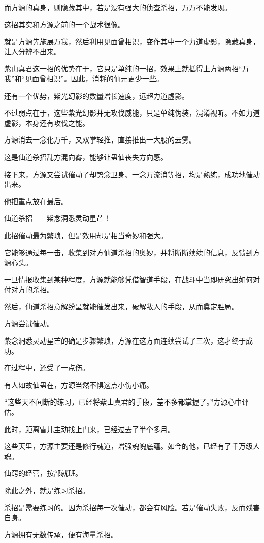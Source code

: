 \begin{this_body}
而方源的真身，则隐藏其中，若是没有强大的侦查杀招，万万不能发现。

这招其实和方源之前的一个战术很像。

就是方源先施展万我，然后利用见面曾相识，变作其中一个力道虚影，隐藏真身，让人分辨不出来。

紫山真君这一招的优势在于，它只是单纯的一招，效果上就抵得上方源两招“万我”和“见面曾相识”。因此，消耗的仙元更少一些。

还有一个优势，紫光幻影的数量增长速度，远超力道虚影。

不过弱点在于，这些紫光幻影并无攻伐威能，只是单纯伪装，混淆视听。不如力道虚影，本身还有攻伐之能。

方源消去一念化万千，又双掌轻推，直接推出一大股的云雾。

这是仙道杀招乱方混向雾，能够让蛊仙丧失方向感。

接下来，方源又尝试催动了却势念卫身、一念万流消等招，均是熟练，成功地催动出来。

他把重点放在最后。

仙道杀招——紫念洞悉灵动星芒！

此招催动最为繁琐，但是效用却是相当奇妙和强大。

它能够通过每一击，收集到对方仙道杀招的奥妙，并将断断续续的信息，反馈到方源心头。

一旦情报收集到某种程度，方源就能够凭借智道手段，在战斗中当即研究出如何对付对方的杀招。

然后，仙道杀招意解纷呈就能催发出来，破解敌人的手段，从而奠定胜局。

方源尝试催动。

紫念洞悉灵动星芒的确是步骤繁琐，方源在这方面连续尝试了三次，这才终于成功。

在过程中，还受了一点伤。

有人如故仙蛊在，方源当然不惧这点小伤小痛。

“这些天不间断的练习，已经将紫山真君的手段，差不多都掌握了。”方源心中评估。

此时，距离雪儿主动找上门来，已经过去了半个多月。

这些天里，方源主要还是修行魂道，增强魂魄底蕴。如今的他，已经有了千万级人魂。

仙窍的经营，按部就班。

除此之外，就是练习杀招。

杀招是需要练习的。因为杀招每一次催动，都会有风险。若是催动失败，反而残害自身。

方源拥有无数传承，便有海量杀招。


\end{this_body}
